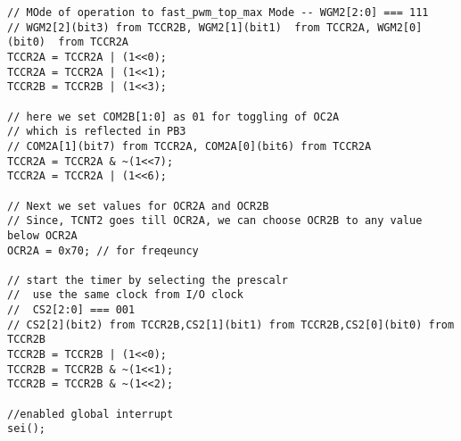 \begin{verbatim}
// MOde of operation to fast_pwm_top_max Mode -- WGM2[2:0] === 111
// WGM2[2](bit3) from TCCR2B, WGM2[1](bit1)  from TCCR2A, WGM2[0](bit0)  from TCCR2A
TCCR2A = TCCR2A | (1<<0);
TCCR2A = TCCR2A | (1<<1);
TCCR2B = TCCR2B | (1<<3);	

// here we set COM2B[1:0] as 01 for toggling of OC2A
// which is reflected in PB3
// COM2A[1](bit7) from TCCR2A, COM2A[0](bit6) from TCCR2A
TCCR2A = TCCR2A & ~(1<<7);
TCCR2A = TCCR2A | (1<<6);

// Next we set values for OCR2A and OCR2B
// Since, TCNT2 goes till OCR2A, we can choose OCR2B to any value below OCR2A
OCR2A = 0x70; // for freqeuncy

// start the timer by selecting the prescalr
//  use the same clock from I/O clock
//  CS2[2:0] === 001
// CS2[2](bit2) from TCCR2B,CS2[1](bit1) from TCCR2B,CS2[0](bit0) from TCCR2B
TCCR2B = TCCR2B | (1<<0);
TCCR2B = TCCR2B & ~(1<<1);
TCCR2B = TCCR2B & ~(1<<2);

//enabled global interrupt
sei();
\end{verbatim}

